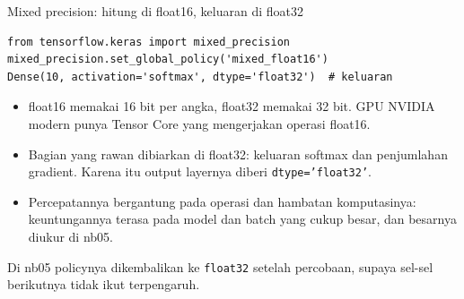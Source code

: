 \documentclass[aspectratio=169,t]{beamer}
\begin{document}
\begin{frame}[fragile]{Mixed precision: hitung di float16, keluaran di float32}
  \vspace{0.2em}
\begin{lstlisting}
from tensorflow.keras import mixed_precision
mixed_precision.set_global_policy('mixed_float16')
Dense(10, activation='softmax', dtype='float32')  # keluaran
\end{lstlisting}
  \vspace{0.4em}
  \begin{itemize}\setlength\itemsep{0.32em}
    \item float16 memakai 16 bit per angka, float32 memakai 32 bit. GPU NVIDIA modern punya
          Tensor Core yang mengerjakan operasi float16.
    \item Bagian yang rawan dibiarkan di float32: keluaran softmax dan penjumlahan gradient.
          Karena itu output layernya diberi \texttt{dtype='float32'}.
    \item Percepatannya bergantung pada operasi dan hambatan komputasinya: keuntungannya
          terasa pada model dan batch yang cukup besar, dan besarnya diukur di nb05.
  \end{itemize}
  \vspace{0.4em}
  {\footnotesize\color{nvgray}Di nb05 policynya dikembalikan ke \texttt{float32} setelah
  percobaan, supaya sel-sel berikutnya tidak ikut terpengaruh.}
\end{frame}
\end{document}

